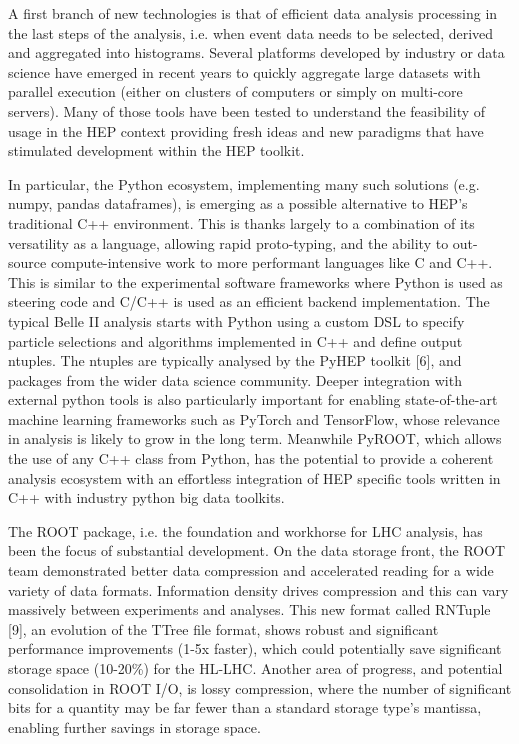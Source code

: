 \documentclass[11pt,a4paper]{article}
\begin{document}
A first branch of new technologies is that of efficient data analysis
processing in the last steps of the analysis, i.e. when event data needs
to be selected, derived and aggregated into histograms. Several
platforms developed by industry or data science have emerged in recent
years to quickly aggregate large datasets with parallel execution
(either on clusters of computers or simply on multi-core servers). Many
of those tools have been tested to understand the feasibility of usage
in the HEP context providing fresh ideas and new paradigms that have
stimulated development within the HEP toolkit.

In particular, the Python ecosystem, implementing many such solutions
(e.g. numpy, pandas dataframes), is emerging as a possible alternative
to HEP's traditional C++ environment. This is thanks largely to a
combination of its versatility as a language, allowing rapid
proto-typing, and the ability to out-source compute-intensive work to
more performant languages like C and C++. This is similar to the
experimental software frameworks where Python is used as steering code
and C/C++ is used as an efficient backend implementation. The typical
Belle II analysis starts with Python using a custom DSL to specify
particle selections and algorithms implemented in C++ and define output
ntuples. The ntuples are typically analysed by the PyHEP toolkit
{[}6{]}, and packages from the wider data science community. Deeper
integration with external python tools is also particularly important
for enabling state-of-the-art machine learning frameworks such as
PyTorch and TensorFlow, whose relevance in analysis is likely to grow in
the long term. Meanwhile PyROOT, which allows the use of any C++ class
from Python, has the potential to provide a coherent analysis ecosystem
with an effortless integration of HEP specific tools written in C++ with
industry python big data toolkits.

The ROOT package, i.e. the foundation and workhorse for LHC analysis,
has been the focus of substantial development. On the data storage
front, the ROOT team demonstrated better data compression and
accelerated reading for a wide variety of data formats. Information
density drives compression and this can vary massively between
experiments and analyses. This new format called RNTuple {[}9{]}, an
evolution of the TTree file format, shows robust and significant
performance improvements (1-5x faster), which could potentially save
significant storage space (10-20\%) for the HL-LHC. Another area of
progress, and potential consolidation in ROOT I/O, is lossy compression,
where the number of significant bits for a quantity may be far fewer
than a standard storage type's mantissa, enabling further savings in
storage space.
\end{document}

